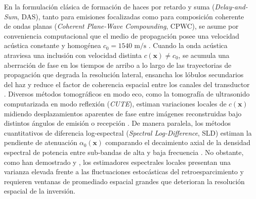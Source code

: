 \documentclass[9pt]{article}
\begin{document}
En la formulación clásica de formación de haces por retardo y suma (\textit{Delay-and-Sum}, DAS), tanto para emisiones focalizadas como para composición coherente de ondas planas (\textit{Coherent Plane-Wave Compounding}, CPWC), se asume por conveniencia computacional que el medio de propagación posee una velocidad acústica constante y homogénea $c_0 = 1540\text{ m/s}$ \parencite{Montaldo2009}. Cuando la onda acústica atraviesa una inclusión con velocidad distinta $c(\mathbf{x}) \neq c_0$, se acumula una aberración de fase en los tiempos de arribo a lo largo de las trayectorias de propagación que degrada la resolución lateral, ensancha los lóbulos secundarios del haz y reduce el factor de coherencia espacial entre los canales del transductor \parencite{Mallart1994, Li2003, Camacho2009, Matrone2015}. Diversos métodos tomográficos en modo eco, como la tomografía de ultrasonido computarizada en modo reflexión (\textit{CUTE}), estiman variaciones locales de $c(\mathbf{x})$ midiendo desplazamientos aparentes de fase entre imágenes reconstruidas bajo distintos ángulos de emisión o recepción \parencite{Jaeger2015, Stahli2020, Rau2021, Feigin2020}. De manera paralela, los métodos cuantitativos de diferencia log-espectral (\textit{Spectral Log-Difference}, SLD) estiman la pendiente de atenuación $\alpha_0(\mathbf{x})$ comparando el decaimiento axial de la densidad espectral de potencia entre sub-bandas de alta y baja frecuencia \parencite{Kuc1979, Insana1983, Kim2008, Nam2011}. No obstante, como han demostrado \textcite{Coila2018} y \textcite{Deeba2019}, los estimadores espectrales locales presentan una varianza elevada frente a las fluctuaciones estocásticas del retroesparcimiento y requieren ventanas de promediado espacial grandes que deterioran la resolución espacial de la inversión.
\end{document}
